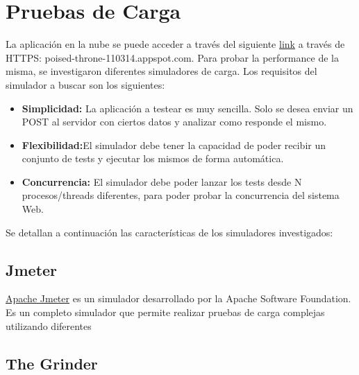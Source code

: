 \documentclass[a4paper,10pt]{article}
\begin{document}


    \newpage
    \section{Pruebas de Carga}
        La aplicación en la nube se puede acceder a través del siguiente \href{https://poised-throne-110314.appspot.com}{link} 
        a través de HTTPS: poised-throne-110314.appspot.com.
        Para probar la performance de la misma, se investigaron diferentes simuladores de carga. Los requisitos del  
        simulador a buscar son los siguientes:

        \begin{itemize}
            \item \textbf{Simplicidad:} La aplicación a testear es muy sencilla. Solo se desea enviar un POST al 
            servidor con ciertos datos y analizar como responde el mismo. 
            \item \textbf{Flexibilidad:}El simulador debe tener la capacidad de poder recibir un conjunto de tests y 
            ejecutar los mismos de forma automática.
            \item \textbf{Concurrencia:} El simulador debe poder lanzar los tests desde N procesos/threads diferentes, 
            para poder probar la concurrencia del sistema Web.
        \end{itemize}

        Se detallan a continuación las características de los simuladores investigados:

        \subsection{Jmeter}
            \href{http://http://jmeter.apache.org}{Apache Jmeter} es un simulador desarrollado por la Apache Software
            Foundation. Es un completo simulador que permite realizar pruebas de carga complejas utilizando diferentes

        \subsection{The Grinder}
            \begin{itemize}
            \end{itemize}
\end{document}

